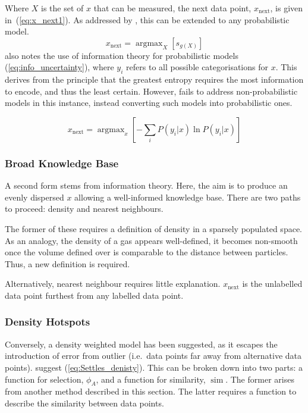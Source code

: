 \documentclass[a4paper, english]{article}
\DeclareMathOperator*{\argmax}{argmax}
\DeclareMathOperator*{\simm}{sim}
\begin{document}
Where $X$ is the set of $x$ that can be measured, the next data point, $x_\mathrm{next}$, is given in~(\ref{eq:x_next1}). As addressed by \textcite{LitRev_2009}, this can be extended to any probabilistic model.
\begin{equation}
    \label{eq:x_next1}
    x_\mathrm{next}=\argmax_X{\left[s_{g(X)}\right]}
\end{equation}
\textcite{LitRev_2009} also notes the use of information theory for probabilistic models (\ref{eq:info_uncertainty}), where $y_i$ refers to all possible categorisations for $x$. This derives from the principle that the greatest entropy requires the most information to encode, and thus the least certain. However, \textcite{LitRev_2009} fails to address non-probabilistic models in this instance, instead converting such models into probabilistic ones.

\begin{equation}
    \label{eq:info_uncertainty}
    x_\mathrm{next}=\argmax_x{\left[-\sum_i{P(y_i|x)\ln{P(y_i|x)}}\right]}
\end{equation}

\subsubsection{Broad Knowledge Base}
A second form stems from information theory. Here, the aim is to produce an evenly dispersed $x$ allowing a well-informed knowledge base. There are two paths to proceed: density and nearest neighbours.

The former of these requires a definition of density in a sparsely populated space. As an analogy, the density of a gas appears well-defined, it becomes non-smooth once the volume defined over is comparable to the distance between particles. Thus, a new definition is required.

Alternatively, nearest neighbour requires little explanation. $x_\mathrm{next}$ is the unlabelled data point furthest from any labelled data point.

\subsubsection{Density Hotspots}
Conversely, a density weighted model has been suggested, as it escapes the introduction of error from outlier (i.e.\ data points far away from alternative data points). \textcite{Settles_2008} suggest (\ref{eq:Settles_denisty}). This can be broken down into two parts: a function for selection, $\phi_A$, and a function for similarity, $\simm$. The former arises from  another method described in this section. The latter requires a function to describe the similarity between data points.
\end{document}
